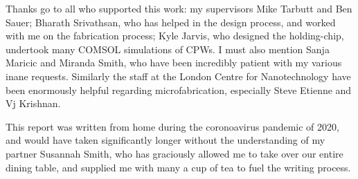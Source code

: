 Thanks go to all who supported this work: my supervisors Mike Tarbutt and Ben
Sauer; Bharath Srivathsan, who has helped in the design process, and worked
with me on the fabrication process; Kyle Jarvis, who designed the holding-chip,
undertook many COMSOL simulations of CPWs.  I must also mention Sanja Maricic
and Miranda Smith, who have been incredibly patient with my various inane
requests. Similarly the staff at the London Centre for Nanotechnology have been
enormously helpful regarding microfabrication, especially Steve Etienne and Vj
Krishnan.

This report was written from home during the coronoavirus pandemic of 2020, and
would have taken significantly longer without the understanding of my partner
Susannah Smith, who has graciously allowed me to take over our entire dining
table, and supplied me with many a cup of tea to fuel the writing process.

